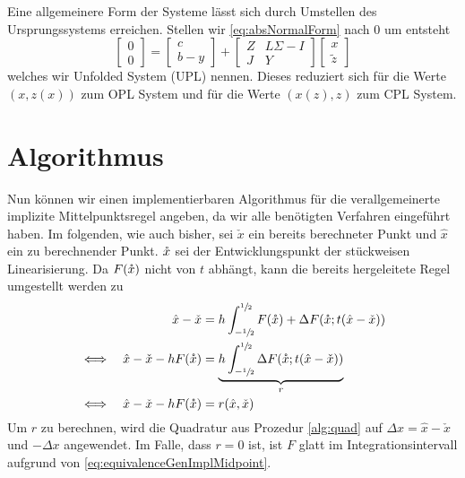 Eine allgemeinere Form der Systeme lässt sich durch Umstellen des Ursprungssystems erreichen. Stellen wir \eqref{eq:absNormalForm} nach $0$ um entsteht
 \begin{equation}
\label{eq:UPL}
  \begin{bmatrix}
   0\\0
  \end{bmatrix}
  =
  \begin{bmatrix}
   c\\b -y
  \end{bmatrix}
  +
  \begin{bmatrix}
   Z & L\Sigma - I \\
   J & Y
  \end{bmatrix}
  \begin{bmatrix}
   x\\ \tilde z
  \end{bmatrix}
 \end{equation}
welches wir Unfolded System (UPL) nennen. Dieses reduziert sich für die Werte $(x,z(x))$ zum OPL System und für die Werte $(x(z),z)$ zum CPL System.
\section{Algorithmus}
Nun können wir einen implementierbaren Algorithmus für die verallgemeinerte implizite Mittelpunktsregel angeben, da wir alle benötigten Verfahren eingeführt haben. Im folgenden, wie auch bisher, sei $\check x$ ein bereits berechneter Punkt und $\hat x$ ein zu berechnender Punkt. $\mathring{x}$ sei der Entwicklungspunkt der stückweisen Linearisierung. Da $F(\mathring{x})$ nicht von $t$ abhängt, kann die bereits hergeleitete Regel umgestellt werden zu 
\begin{equation}
\label{eq:genMidpointAlg}
\begin{aligned}
 && \hat x - \check x &= h\int_{-\sfrac{1}{2}}^{\sfrac{1}{2}}F(\mathring{x})+ \Delta F(\mathring{x};t(\hat x - \check x)) \\
 \iff && \hat x - \check x - hF(\mathring{x}) & =\underbrace{h \int_{-\sfrac{1}{2}}^{\sfrac{1}{2}} \Delta F(\mathring{x};t(\hat x - \check x))}_{r} \\
 \iff && \hat x - \check x - hF(\mathring{x}) & =r(\hat x,\check x)
\end{aligned}
\end{equation}
Um $r$ zu berechnen, wird die Quadratur aus Prozedur \ref{alg:quad} auf $\Delta x = \hat x - \check x$ und $-\Delta x$ angewendet. Im Falle, dass $r=0$ ist, ist $F$ glatt im Integrationsintervall aufgrund von \eqref{eq:equivalenceGenImplMidpoint}.


